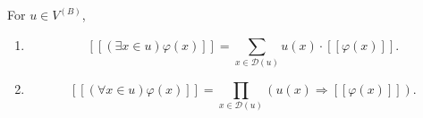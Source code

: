 For $u \in V^{(B)}$,
\begin{enumerate}
\item $$[\![(\exists x \in u) \varphi(x)]\!] = \sum_{x \in \mathcal{D}(u)} u(x) \cdot [\![\varphi(x)]\!].$$
\item $$[\![(\forall x \in u) \varphi(x)]\!] = \prod_{x \in \mathcal{D}(u)} (u(x) \Rightarrow [\![\varphi(x)]\!]).$$
\end{enumerate}
